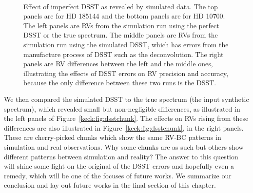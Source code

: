 \begin{figure}
\
\
\caption{Effect of imperfect DSST as revealed by simulated data. The top
  panels are for HD 185144 and the bottom panels are for HD 10700. The
  left panels are RVs from the simulation run using the perfect DSST
  or the true spectrum. The middle panels are RVs from the simulation
  run using the simulated DSST, which has errors from the manufacture
  process of DSST such as the deconvolution. The right panels are RV
  differences between the left and the middle ones, illustrating the
  effects of DSST errors on RV precision and accuracy, because the
  only difference between these two runs is the DSST.
\label{keck:fig:dsst}}
\end{figure}


We then compared the simulated DSST to the true spectrum (the input
synthetic spectrum), which revealed small but non-negligible
differences, as illustrated in the left panels of
Figure~\ref{keck:fig:dsstchunk}. The effects on RVs rising from these
differences are also illustrated in Figure~\ref{keck:fig:dsstchunk},
in the right panels. These are cherry-picked chunks which show the
same RV-BC patterns in simulation and real observations. Why some
chunks are as such but others show different patterns between
simulation and reality? The answer to this question will shine some
light on the original of the DSST errors and hopefully even a remedy,
which will be one of the focuses of future works. We summarize our
conclusion and lay out future works in the final section of this chapter.


